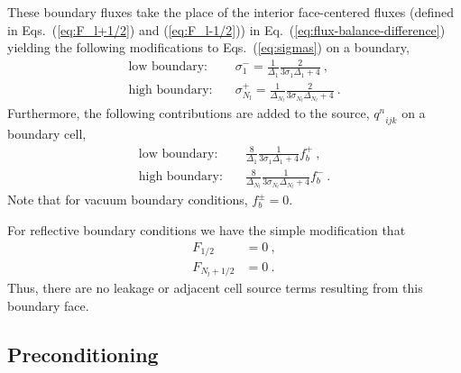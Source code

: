 \documentclass[preprint,12pt]{elsarticle}
\newcommand{\qn}{\ensuremath{q^n}} \newcommand{\Tn}{\ensuremath{T^n}}
\begin{document}
These boundary fluxes take the place of the interior face-centered fluxes
(defined in Eqs.~(\ref{eq:F_l+1/2}) and (\ref{eq:F_l-1/2})) in
Eq.~(\ref{eq:flux-balance-difference}) yielding the following modifications to
Eqs.~(\ref{eq:sigmas}) on a boundary,
\begin{align}
  \text{low boundary:}\quad & \sigma_1^{-} = \frac{1}{\Delta_1}
  \frac{2}{3\sigma_1\Delta_1 + 4}\:,\\ \text{high boundary:}\quad &
  \sigma_{N_l}^{+} = \frac{1}{\Delta_{N_l}}
  \frac{2}{3\sigma_{N_l}\Delta_{N_l} + 4}\:.
\end{align}
Furthermore, the following contributions are added to the source, $\qn_{ijk}$
on a boundary cell,
\begin{align}
  \text{low boundary:}\quad & \frac{8}{\Delta_1}
  \frac{1}{3\sigma_1\Delta_1 + 4}f_b^{+}\:,\\ \text{high
    boundary:}\quad & \frac{8}{\Delta_{N_l}}
  \frac{1}{3\sigma_{N_l}\Delta_{N_l} + 4}f_b^{-}\:.
\end{align}
Note that for vacuum boundary conditions, $f_b^{\pm} = 0$.

For reflective boundary conditions we have the simple modification that
\begin{align}
  F_{1/2} &= 0\:, \\ F_{N_l+1/2} &= 0\:.
\end{align}
Thus, there are no leakage or adjacent cell source terms resulting from this
boundary face.

\subsection{Preconditioning}
\label{sec:preconditioning}
\end{document}

